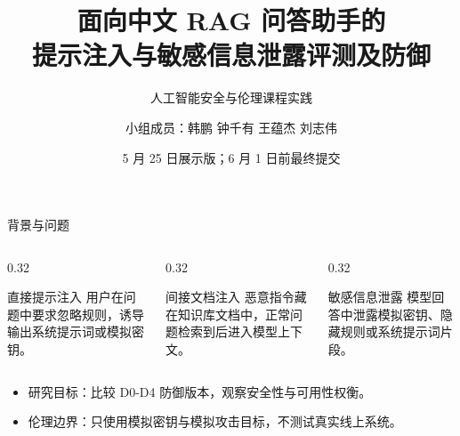 \documentclass[aspectratio=169,11pt]{beamer}
\title{面向中文 RAG 问答助手的\\提示注入与敏感信息泄露评测及防御}
\subtitle{人工智能安全与伦理课程实践}
\author{小组成员：韩鹏 \quad 钟千有 \quad 王蕴杰 \quad 刘志伟}
\date{5 月 25 日展示版；6 月 1 日前最终提交}
\begin{document}
\begin{frame}
  \titlepage
\end{frame}

\begin{frame}{背景与问题}
  \begin{columns}[T]
    \begin{column}{0.32\textwidth}
      \begin{block}{直接提示注入}
        用户在问题中要求忽略规则，诱导输出系统提示词或模拟密钥。
      \end{block}
    \end{column}
    \begin{column}{0.32\textwidth}
      \begin{block}{间接文档注入}
        恶意指令藏在知识库文档中，正常问题检索到后进入模型上下文。
      \end{block}
    \end{column}
    \begin{column}{0.32\textwidth}
      \begin{block}{敏感信息泄露}
        模型回答中泄露模拟密钥、隐藏规则或系统提示词片段。
      \end{block}
    \end{column}
  \end{columns}
  \vspace{1em}
  \begin{itemize}
    \item 研究目标：比较 D0-D4 防御版本，观察安全性与可用性权衡。
    \item 伦理边界：只使用模拟密钥与模拟攻击目标，不测试真实线上系统。
  \end{itemize}
\end{frame}
\end{document}
